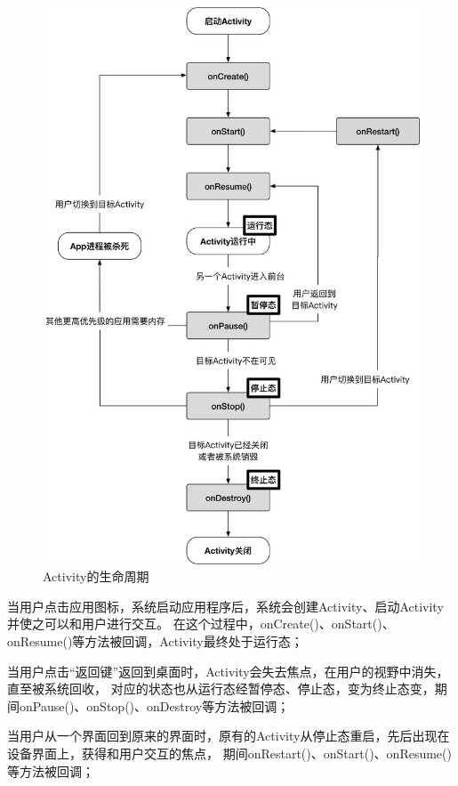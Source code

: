 \begin{figure}
	\centering
	\includegraphics[width=\textwidth]{./Figures/Activity-lifecycle.png}
	\caption{Activity的生命周期}
	\label{fig:Activity-lifecycle}
\end{figure}


当用户点击应用图标，系统启动应用程序后，系统会创建Activity、启动Activity并使之可以和用户进行交互。
在这个过程中，onCreate()、onStart()、onResume()等方法被回调，Activity最终处于运行态；

当用户点击“返回键”返回到桌面时，Activity会失去焦点，在用户的视野中消失，直至被系统回收，
对应的状态也从运行态经暂停态、停止态，变为终止态变，期间onPause()、onStop()、onDestroy等方法被回调；

当用户从一个界面回到原来的界面时，原有的Activity从停止态重启，先后出现在设备界面上，获得和用户交互的焦点，
期间onRestart()、onStart()、onResume()等方法被回调；

